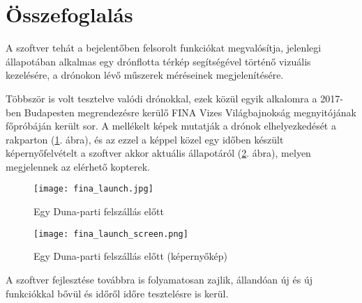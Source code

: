 \section{Összefoglalás}

A szoftver tehát a bejelentőben felsorolt funkciókat megvalósítja, jelenlegi
állapotában alkalmas egy drónflotta térkép segítségével történő vizuális
kezelésére, a drónokon lévő műszerek méréseinek megjelenítésére.

Többször is volt tesztelve valódi drónokkal, ezek közül egyik alkalomra a
2017-ben Budapesten megrendezésre kerülő FINA Vizes Világbajnokság megnyitójának
főpróbáján került sor. A mellékelt képek mutatják a drónok elhelyezkedését a
rakparton (\ref{fig:fina_launch}. ábra), és az ezzel a képpel közel egy időben készült
képernyőfelvételt a szoftver akkor aktuális állapotáról
(\ref{fig:fina_launch_screen}. ábra), melyen megjelennek az elérhető kopterek.

\begin{figure}[H]
  \texttt{[image: fina\_launch.jpg]}
  \caption{Egy Duna-parti felszállás előtt}
  \label{fig:fina_launch}
\end{figure}

\begin{figure}[H]
  \texttt{[image: fina\_launch\_screen.png]}
  \caption{Egy Duna-parti felszállás előtt (képernyőkép)}
  \label{fig:fina_launch_screen}
\end{figure}

A szoftver fejlesztése továbbra is folyamatosan zajlik, állandóan új és új
funkciókkal bővül és időről időre tesztelésre is kerül.
